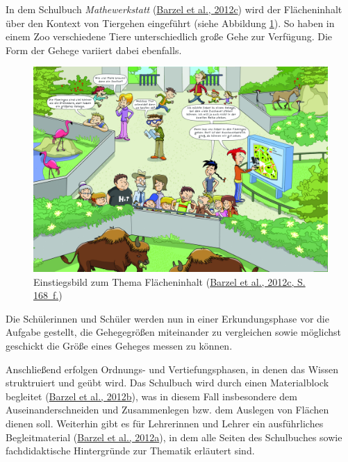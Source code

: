 \documentclass[
]{scrbook}
\theoremstyle{definition}
\theoremstyle{definition}
\theoremstyle{definition}
\theoremstyle{definition}
\theoremstyle{remark}
\begin{document}
In dem Schulbuch \emph{Mathewerkstatt} (\protect\hyperlink{ref-Barzel2012}{Barzel et al., 2012c}) wird der Flächeninhalt über den Kontext von Tiergehen eingeführt (siehe Abbildung \ref{fig:Tiergehege}). So haben in einem Zoo verschiedene Tiere unterschiedlich große Gehe zur Verfügung. Die Form der Gehege variiert dabei ebenfalls.



\begin{figure}

{\centering \includegraphics[width=1\linewidth]{pictures/5-Tiergehege} 

}

\caption{Einstiegsbild zum Thema Flächeninhalt (\protect\hyperlink{ref-Barzel2012}{Barzel et al., 2012c, S. 168~f.})}\label{fig:Tiergehege}
\end{figure}

Die Schülerinnen und Schüler werden nun in einer Erkundungsphase vor die Aufgabe gestellt, die Gehegegrößen miteinander zu vergleichen sowie möglichst geschickt die Größe eines Geheges messen zu können.

Anschließend erfolgen Ordnungs- und Vertiefungsphasen, in denen das Wissen struktruiert und geübt wird. Das Schulbuch wird durch einen Materialblock begleitet (\protect\hyperlink{ref-Barzel2012b}{Barzel et al., 2012b}), was in diesem Fall insbesondere dem Auseinanderschneiden und Zusammenlegen bzw. dem Auslegen von Flächen dienen soll. Weiterhin gibt es für Lehrerinnen und Lehrer ein ausführliches Begleitmaterial (\protect\hyperlink{ref-Barzel2012a}{Barzel et al., 2012a}), in dem alle Seiten des Schulbuches sowie fachdidaktische Hintergründe zur Thematik erläutert sind.
\end{document}

